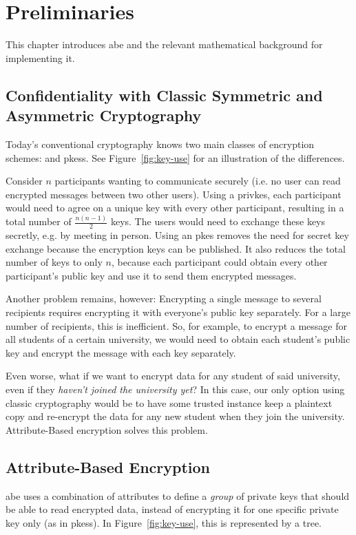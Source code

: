 \chapter{Preliminaries}\label{chapter:background}
This chapter introduces \acrlong{abe} and the relevant mathematical background for implementing it.



\section{Confidentiality with Classic Symmetric and Asymmetric Cryptography}
Today's conventional cryptography knows two main classes of encryption schemes:  and \glspl{pkes}. See Figure~\ref{fig:key-use} for an illustration of the differences.

Consider $n$ participants wanting to communicate securely (i.e. no user can read encrypted messages between two other users).
Using a \gls{privkes}, each participant would need to agree on a unique key with every other participant, resulting in a total number of $\frac{n(n-1)}{2}$ keys.
The users would need to exchange these keys secretly, e.g. by meeting in person.
Using an \gls{pkes} removes the need for secret key exchange because the encryption keys can be published.
It also reduces the total number of keys to only $n$, because each participant could obtain every other participant's public key and use it to send them encrypted messages.

Another problem remains, however: Encrypting a single message to several recipients requires encrypting it with everyone's public key separately.
For a large number of recipients, this is inefficient.
So, for example, to encrypt a message for all students of a certain university, we would need to obtain each student's public key and encrypt the message with each key separately.

Even worse, what if we want to encrypt data for any student of said university, even if they \emph{haven't joined the university yet}?
In this case, our only option using classic cryptography would be to have some trusted instance keep a plaintext copy and re-encrypt the data for any new student when they join the university.
Attribute-Based encryption solves this problem.

\section{Attribute-Based Encryption}\label{sec:background-abe}
\acrfull{abe} uses a combination of attributes to define a \emph{group} of private keys that should be able to read encrypted data, instead of encrypting it for one specific private key only (as in \glspl{pkes}).
In Figure~\ref{fig:key-use}, this is represented by a tree.

